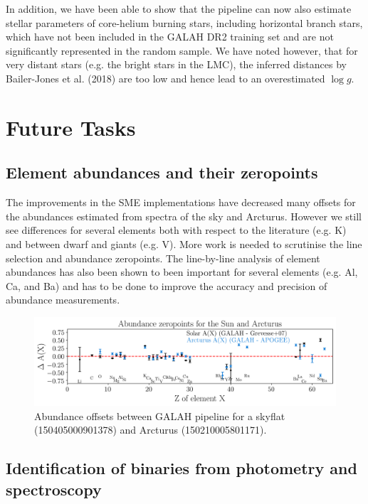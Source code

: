 \documentclass[a4paper,11pt,english]{article}
\begin{document}
In addition, we have been able to show that the pipeline can now also estimate stellar parameters of core-helium burning stars, including horizontal branch stars, which have not been included in the GALAH DR2 training set and are not significantly represented in the random sample. We have noted however, that for very distant stars (e.g. the bright stars in the LMC), the inferred distances by Bailer-Jones et al. (2018) are too low and hence lead to an overestimated $\log g$.

\newpage

\section{Future Tasks}

\subsection{Element abundances and their zeropoints}

The improvements in the SME implementations have decreased many offsets for the abundances estimated from spectra of the sky and Arcturus. However we still see differences for several elements both with respect to the literature (e.g. K) and between dwarf and giants (e.g. V). More work is needed to scrutinise the line selection and abundance zeropoints. The line-by-line analysis of element abundances has also been shown to been important for several elements (e.g. Al, Ca, and Ba) and has to be done to improve the accuracy and precision of abundance measurements.

\begin{figure}[!ht]
\centering
\includegraphics[width=\textwidth]{../../abundance_zeropoints/figures/abundance_zeropoints.png}
\caption{Abundance offsets between GALAH pipeline for a skyflat (150405000901378) and Arcturus (150210005801171).}
\label{fig:abundance_zeropoints}
\end{figure}

\subsection{Identification of binaries from photometry and spectroscopy}
\end{document}
